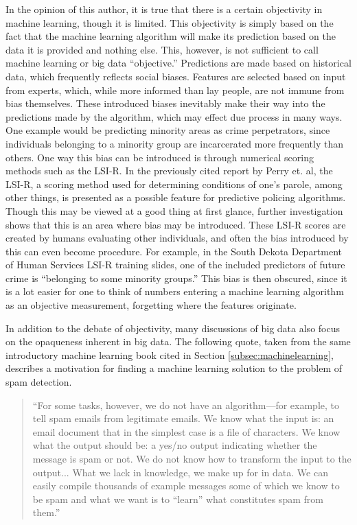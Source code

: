 \documentclass[12pt]{article} %
\begin{document}
In the opinion of this author, it is true that there is a certain objectivity in machine learning, though it is limited. This objectivity is simply based on the fact that the machine learning algorithm will make its prediction based on the data it is provided and nothing else. This, however, is not sufficient to call machine learning or big data ``objective.'' Predictions are made based on historical data, which frequently reflects social biases. Features are selected based on input from experts, which, while more informed than lay people, are not immune from bias themselves. These introduced biases inevitably make their way into the predictions made by the algorithm, which may effect due process in many ways. One example would be predicting minority areas as crime perpetrators, since individuals belonging to a minority group are incarcerated more frequently than others. \cite{naacp} One way this bias can be introduced is through numerical scoring methods such as the LSI-R. In the previously cited report by Perry et. al, the LSI-R, a scoring method used for determining conditions of one's parole, among other things, is presented as a possible feature for predictive policing algorithms. Though this may be viewed at a good thing at first glance, further investigation shows that this is an area where bias may be introduced. These LSI-R scores are created by humans evaluating other individuals, and often the bias introduced by this can even become procedure. For example, in the South Dekota Department of Human Services LSI-R training slides, one of the included predictors of future crime is ``belonging to some minority groups.'' \cite{dekota} This bias is then obscured, since it is a lot easier for one to think of numbers entering a machine learning algorithm as an objective measurement, forgetting where the features originate.

In addition to the debate of objectivity, many discussions of big data also focus on the opaqueness inherent in big data.\cite{pasquale2015black} The following quote, taken from the same introductory machine learning book cited in Section \ref{subsec:machinelearning}, describes a motivation for finding a machine learning solution to the problem of spam detection. \cite{introduction}
\begin{quote}
``For some tasks, however, we do not have an algorithm—for example,
to tell spam emails from legitimate emails.  We know what the input is:
an email document that in the simplest case is a file of characters.  We
know what the output should be: a yes/no output indicating whether the
message is spam or not.  We do not know how to transform the input
to the output... 
What we lack in  knowledge,  we make up for in  data.   We can  easily
compile thousands of example messages some of which we know to be
spam and what we want is to ``learn'' what constitutes spam from them.''
\end{quote} 
\end{document}
